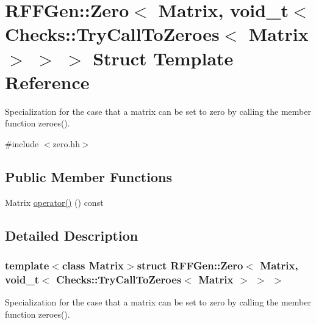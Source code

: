 \hypertarget{structRFFGen_1_1Zero_3_01Matrix_00_01void__t_3_01Checks_1_1TryCallToZeroes_3_01Matrix_01_4_01_4_01_4}{\section{R\-F\-F\-Gen\-:\-:Zero$<$ Matrix, void\-\_\-t$<$ Checks\-:\-:Try\-Call\-To\-Zeroes$<$ Matrix $>$ $>$ $>$ Struct Template Reference}
\label{structRFFGen_1_1Zero_3_01Matrix_00_01void__t_3_01Checks_1_1TryCallToZeroes_3_01Matrix_01_4_01_4_01_4}
}


Specialization for the case that a matrix can be set to zero by calling the member function zeroes().  




{\ttfamily \#include $<$zero.\-hh$>$}

\subsection*{Public Member Functions}
\begin{DoxyCompactItemize}
\item 
Matrix \hyperlink{structRFFGen_1_1Zero_3_01Matrix_00_01void__t_3_01Checks_1_1TryCallToZeroes_3_01Matrix_01_4_01_4_01_4_af8d182d4cfd39955e26f532f24536e77}{operator()} () const 
\end{DoxyCompactItemize}


\subsection{Detailed Description}
\subsubsection*{template$<$class Matrix$>$struct R\-F\-F\-Gen\-::\-Zero$<$ Matrix, void\-\_\-t$<$ Checks\-::\-Try\-Call\-To\-Zeroes$<$ Matrix $>$ $>$ $>$}

Specialization for the case that a matrix can be set to zero by calling the member function zeroes(). 

